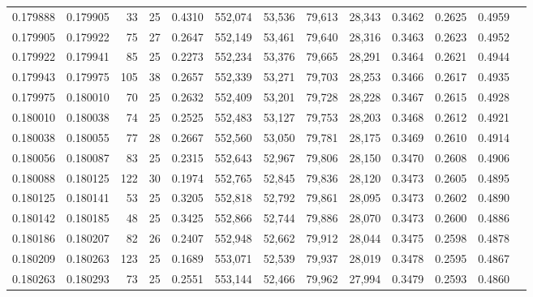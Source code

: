 \begin{tabular}{rrrrrrrrrrrrr}
0.179888 & 0.179905 &  33 &  25 &                                     0.4310 & 552,074 &  53,536 &  79,613 &  28,343 & 0.3462 & 0.2625 & 0.4959 \\
0.179905 & 0.179922 &  75 &  27 &                                     0.2647 & 552,149 &  53,461 &  79,640 &  28,316 & 0.3463 & 0.2623 & 0.4952 \\
0.179922 & 0.179941 &  85 &  25 &                                     0.2273 & 552,234 &  53,376 &  79,665 &  28,291 & 0.3464 & 0.2621 & 0.4944 \\
0.179943 & 0.179975 & 105 &  38 &                                     0.2657 & 552,339 &  53,271 &  79,703 &  28,253 & 0.3466 & 0.2617 & 0.4935 \\
0.179975 & 0.180010 &  70 &  25 &                                     0.2632 & 552,409 &  53,201 &  79,728 &  28,228 & 0.3467 & 0.2615 & 0.4928 \\
0.180010 & 0.180038 &  74 &  25 &                                     0.2525 & 552,483 &  53,127 &  79,753 &  28,203 & 0.3468 & 0.2612 & 0.4921 \\
0.180038 & 0.180055 &  77 &  28 &                                     0.2667 & 552,560 &  53,050 &  79,781 &  28,175 & 0.3469 & 0.2610 & 0.4914 \\
0.180056 & 0.180087 &  83 &  25 &                                     0.2315 & 552,643 &  52,967 &  79,806 &  28,150 & 0.3470 & 0.2608 & 0.4906 \\
0.180088 & 0.180125 & 122 &  30 &                                     0.1974 & 552,765 &  52,845 &  79,836 &  28,120 & 0.3473 & 0.2605 & 0.4895 \\
0.180125 & 0.180141 &  53 &  25 &                                     0.3205 & 552,818 &  52,792 &  79,861 &  28,095 & 0.3473 & 0.2602 & 0.4890 \\
0.180142 & 0.180185 &  48 &  25 &                                     0.3425 & 552,866 &  52,744 &  79,886 &  28,070 & 0.3473 & 0.2600 & 0.4886 \\
0.180186 & 0.180207 &  82 &  26 &                                     0.2407 & 552,948 &  52,662 &  79,912 &  28,044 & 0.3475 & 0.2598 & 0.4878 \\
0.180209 & 0.180263 & 123 &  25 &                                     0.1689 & 553,071 &  52,539 &  79,937 &  28,019 & 0.3478 & 0.2595 & 0.4867 \\
0.180263 & 0.180293 &  73 &  25 &                                     0.2551 & 553,144 &  52,466 &  79,962 &  27,994 & 0.3479 & 0.2593 & 0.4860 \\

\end{tabular}
